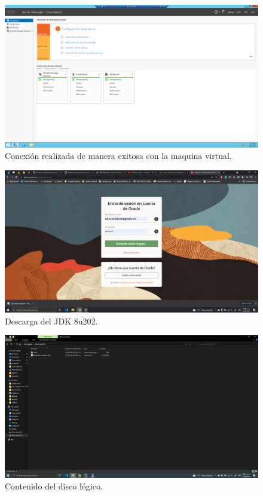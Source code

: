 \documentclass[11pt]{article}
\begin{document}
		\begin{figure}[H]
			\centering
			\includegraphics[scale=0.34]{resources/conexionok.png}
			\caption{Conexión realizada de manera exitosa con la maquina virtual.}\label{fig:picture}
		\end{figure}
		\begin{figure}[H]
			\centering
			\includegraphics[scale=0.34]{resources/descargajdk.png}
			\caption{Descarga del JDK 8u202.}\label{fig:picture}
		\end{figure}
		\begin{figure}[H]
			\centering
			\includegraphics[scale=0.34]{resources/contenidoscarpetalocal.png}
			\caption{Contenido del disco lógico.}\label{fig:picture}
		\end{figure}
\end{document}
